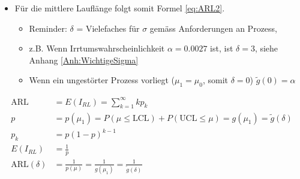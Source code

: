 \begin{itemize}
\begin{itemize}
\begin{itemize}
		\end{itemize}
	\end{itemize}
	\item Für die mittlere Lauflänge folgt somit Formel \ref{eq:ARL2}. 
	\begin{itemize}
		\item Reminder: $\delta$ = Vielefaches für $\sigma$ gemäss Anforderungen an Prozess, 
		\item z.B. Wenn Irrtumswahrscheinlichkeit $\alpha = 0.0027$ ist, ist $\delta = 3$, siehe Anhang \ref{Anh:WichtigeSigma}
		\item Wenn ein ungestörter Prozess vorliegt ($\mu_1=\mu_0$, somit $\delta=0$) $\tilde{g}(0)=\alpha$
	\end{itemize}
\end{itemize}
\begin{align}
\label{eq:ARL}
\text{ARL} &= E\left(I_{RL}\right) = \sum_{k=1}^{\infty}kp_k\\
\label{eq:ParamP}
p &= p(\mu_1) = P(\mu\leq \text{LCL})+P(\text{UCL}\leq\mu) = g(\mu_1) = \tilde{g}(\delta)\\
\label{eq:geomverteilung}
p_k&= p(1-p)^{k-1}\\
\label{eq:Erwartungswert}
E(I_{RL}) &= \frac{1}{p}\\
\label{eq:ARL2}
\text{ARL}(\delta) &= \frac{1}{p(\mu)} = \frac{1}{g(\mu_1)}=\frac{1}{\tilde{g}(\delta)}
\end{align}

